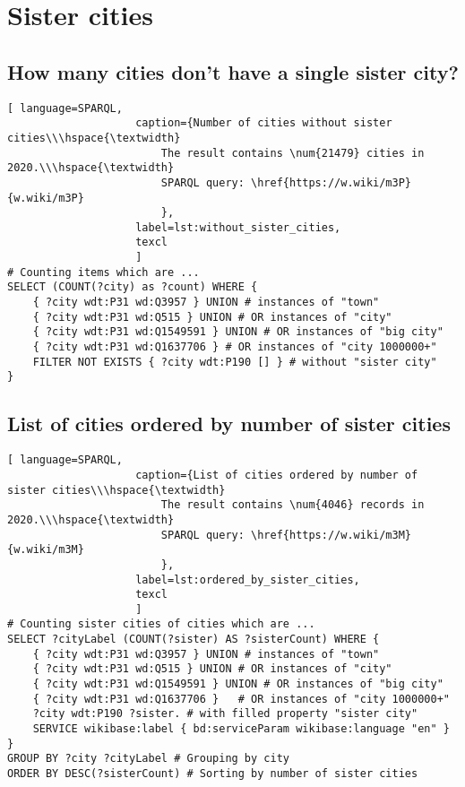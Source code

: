 \section{Sister cities}

\subsection{How many cities don't have a single sister city?}

\begin{lstlisting}[ language=SPARQL, 
                    caption={Number of cities without sister cities\\\hspace{\textwidth}
                        The result contains \num{21479} cities in 2020.\\\hspace{\textwidth}
                        SPARQL query: \href{https://w.wiki/m3P}{w.wiki/m3P}
                        },
                    label=lst:without_sister_cities,
                    texcl 
                    ]
# Counting items which are ... 
SELECT (COUNT(?city) as ?count) WHERE {                             
	{ ?city wdt:P31 wd:Q3957 } UNION # instances of "town"          
	{ ?city wdt:P31 wd:Q515 } UNION # OR instances of "city"                 
	{ ?city wdt:P31 wd:Q1549591 } UNION # OR instances of "big city"                       
	{ ?city wdt:P31 wd:Q1637706 } # OR instances of "city 1000000+"              
	FILTER NOT EXISTS { ?city wdt:P190 [] } # without "sister city"
}
\end{lstlisting}%

\subsection{List of cities ordered by number of sister cities}

\begin{lstlisting}[ language=SPARQL, 
                    caption={List of cities ordered by number of sister cities\\\hspace{\textwidth}
                        The result contains \num{4046} records in 2020.\\\hspace{\textwidth}
                        SPARQL query: \href{https://w.wiki/m3M}{w.wiki/m3M}
                        },
                    label=lst:ordered_by_sister_cities,
                    texcl 
                    ]
# Counting sister cities of cities which are ...
SELECT ?cityLabel (COUNT(?sister) AS ?sisterCount) WHERE {           
	{ ?city wdt:P31 wd:Q3957 } UNION # instances of "town"
	{ ?city wdt:P31 wd:Q515 } UNION # OR instances of "city"
	{ ?city wdt:P31 wd:Q1549591 } UNION # OR instances of "big city"
	{ ?city wdt:P31 wd:Q1637706 }	# OR instances of "city 1000000+"
	?city wdt:P190 ?sister. # with filled property "sister city"
	SERVICE wikibase:label { bd:serviceParam wikibase:language "en" }
}
GROUP BY ?city ?cityLabel # Grouping by city                                   
ORDER BY DESC(?sisterCount) # Sorting by number of sister cities
\end{lstlisting}%

